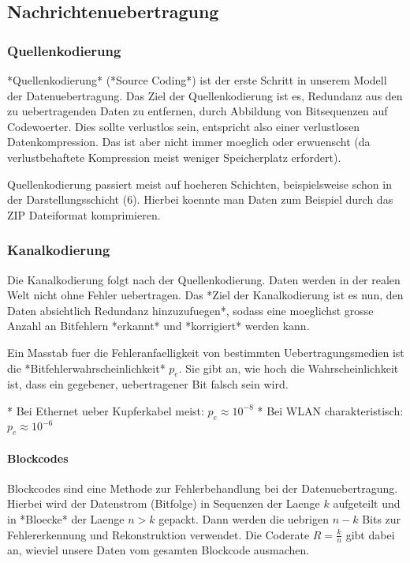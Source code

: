 \subsection{ Nachrichtenuebertragung}

\subsubsection{ Quellenkodierung}

*Quellenkodierung* (*Source Coding*) ist der erste Schritt in unserem Modell der
Datenuebertragung. Das Ziel der Quellenkodierung ist es, Redundanz aus den zu
uebertragenden Daten zu entfernen, durch Abbildung von Bitsequenzen auf
Codewoerter. Dies sollte verlustlos sein, entspricht also einer verlustlosen
Datenkompression. Das ist aber nicht immer moeglich oder erwuenscht (da
verlustbehaftete Kompression meist weniger Speicherplatz erfordert).

Quellenkodierung passiert meist auf hoeheren Schichten, beispielsweise schon in
der Darstellungsschicht (6). Hierbei koennte man Daten zum Beispiel durch das
ZIP Dateiformat komprimieren.

\subsubsection{ Kanalkodierung}

Die Kanalkodierung folgt nach der Quellenkodierung. Daten werden in der realen
Welt nicht ohne Fehler uebertragen. Das *Ziel der Kanalkodierung ist es nun, den
Daten absichtlich Redundanz hinzuzufuegen*, sodass eine moeglichst grosse Anzahl
an Bitfehlern *erkannt* und *korrigiert* werden kann.

Ein Masstab fuer die Fehleranfaelligkeit von bestimmten Uebertragungsmedien ist
die *Bitfehlerwahrscheinlichkeit* $p_e$. Sie gibt an, wie hoch die
Wahrscheinlichkeit ist, dass ein gegebener, uebertragener Bit falsch sein wird.

* Bei Ethernet ueber Kupferkabel meist: $p_e \approx 10^{-8}$
* Bei WLAN charakteristisch: $p_e \approx 10^{-6}$

\paragraph{ Blockcodes}

Blockcodes sind eine Methode zur Fehlerbehandlung bei der
Datenuebertragung. Hierbei wird der Datenstrom (Bitfolge) in Sequenzen der
Laenge $k$ aufgeteilt und in *Bloecke* der Laenge $n > k$ gepackt. Dann werden
die uebrigen $n - k$ Bits zur Fehlererkennung und Rekonstruktion verwendet. Die
Coderate $R = \frac{k}{n}$ gibt dabei an, wieviel unsere Daten vom gesamten
Blockcode ausmachen.

